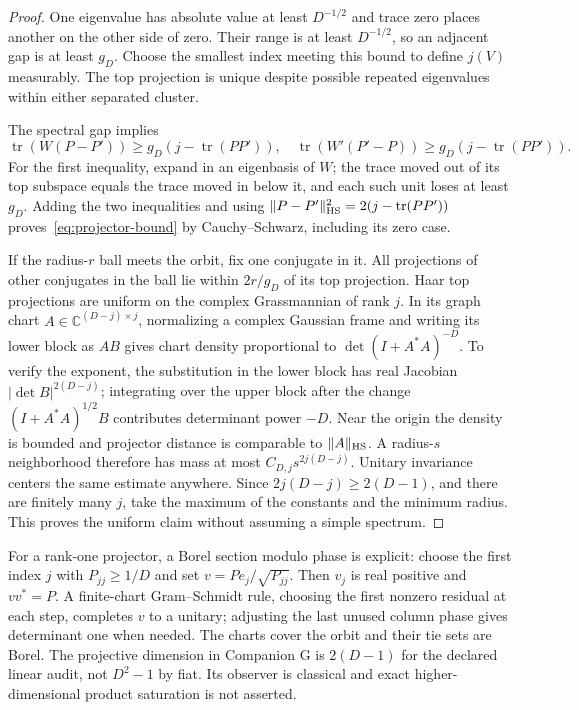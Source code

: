 \begin{proof}
One eigenvalue has absolute value at least $D^{-1/2}$ and trace zero places another on the other side of zero. Their range is at least $D^{-1/2}$, so an adjacent gap is at least $g_D$. Choose the smallest index meeting this bound to define $j(V)$ measurably. The top projection is unique despite possible repeated eigenvalues within either separated cluster.

The spectral gap implies
\[
 \operatorname{tr}(W(P-P'))\ge g_D(j-\operatorname{tr}(PP')),
 \quad
 \operatorname{tr}(W'(P'-P))\ge g_D(j-\operatorname{tr}(PP')).
\]
For the first inequality, expand in an eigenbasis of $W$; the trace moved out of its top subspace equals the trace moved in below it, and each such unit loses at least $g_D$. Adding the two inequalities and using
$\|P-P'\|_{\rm HS}^2=2(j-\operatorname{tr}(PP'))$ proves~\eqref{eq:projector-bound} by Cauchy--Schwarz, including its zero case.

If the radius-$r$ ball meets the orbit, fix one conjugate in it. All projections of other conjugates in the ball lie within $2r/g_D$ of its top projection. Haar top projections are uniform on the complex Grassmannian of rank $j$. In its graph chart $A\in\mathbb C^{(D-j)\times j}$, normalizing a complex Gaussian frame and writing its lower block as $AB$ gives chart density proportional to $\det(I+A^*A)^{-D}$. To verify the exponent, the substitution in the lower block has real Jacobian $|\det B|^{2(D-j)}$; integrating over the upper block after the change $(I+A^*A)^{1/2}B$ contributes determinant power $-D$. Near the origin the density is bounded and projector distance is comparable to $\|A\|_{\rm HS}$. A radius-$s$ neighborhood therefore has mass at most $C_{D,j}s^{2j(D-j)}$. Unitary invariance centers the same estimate anywhere. Since $2j(D-j)\ge2(D-1)$, and there are finitely many $j$, take the maximum of the constants and the minimum radius. This proves the uniform claim without assuming a simple spectrum.
\end{proof}
For a rank-one projector, a Borel section modulo phase is explicit: choose the first index $j$ with $P_{jj}\ge1/D$ and set $v=P e_j/\sqrt{P_{jj}}$. Then $v_j$ is real positive and $vv^*=P$. A finite-chart Gram--Schmidt rule, choosing the first nonzero residual at each step, completes $v$ to a unitary; adjusting the last unused column phase gives determinant one when needed. The charts cover the orbit and their tie sets are Borel. The projective dimension in Companion G is $2(D-1)$ for the declared linear audit, not $D^2-1$ by fiat. Its observer is classical and exact higher-dimensional product saturation is not asserted.

